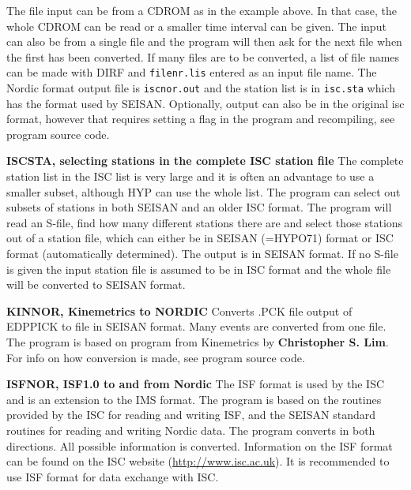 The file input can be from a CDROM as in the example above. In that case, the whole CDROM can be read or a smaller time interval can be given. The input can also be from a single file and the program will then ask for the next file when the first has been converted. If many files are to be converted, a list of file names can be made with DIRF and \texttt{filenr.lis} entered as an input file name. The Nordic format output file is \texttt{iscnor.out} and the station list is in \texttt{isc.sta} which has the format used by SEISAN. Optionally, output can also be in the original isc format, however that requires setting a flag in the program and recompiling, see program source code. 

\textbf{ISCSTA, selecting stations in the complete ISC station file} \newline
{}
The complete station list in the ISC list is very large and it is often an advantage to use a smaller subset, although HYP can use the whole list. The program can select out subsets of stations in both SEISAN and an older ISC format. The program will read an S-file, find how many different stations there are and select those stations out of a station file, which can either be in SEISAN (=HYPO71) format or ISC format (automatically determined). The output is in SEISAN format. If no S-file is given the input station file is assumed to be in ISC format and the whole file will be converted to SEISAN format. 

\textbf{KINNOR, Kinemetrics to NORDIC} \newline
Converts .PCK file output of EDPPICK to file in SEISAN format. Many events are converted from one file. The program is based on program from Kinemetrics by \textbf{Christopher S. Lim}. For info on how conversion is made, see program source code.  

\textbf{ISFNOR, ISF1.0 to and from Nordic}\newline
{}
The ISF format is used by the ISC and is an extension to the IMS format. The program is based on the routines provided by the ISC for reading and writing ISF, and the SEISAN standard routines for reading and writing Nordic data. The program converts in both directions. All possible information is converted. Information on the ISF format can be found on the ISC website (\url{http://www.isc.ac.uk}). It is recommended to use ISF format for data exchange with ISC. 

